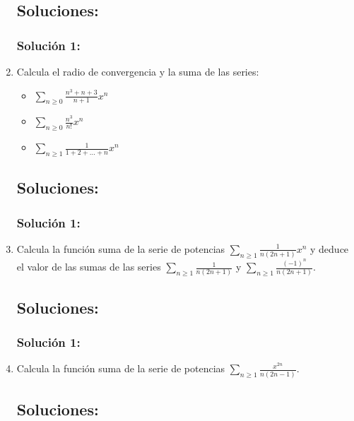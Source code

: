 \documentclass[a4paper, 11pt]{article} %
\begin{document}
\begin{enumerate}
	\subsection*{Soluciones:}
		\subsubsection*{Solución 1:}
	
	\item Calcula el radio de convergencia y la suma de las series:
	\begin{itemize}
		\item $\displaystyle{\sum_{n \geq 0} \frac{n^3+n+3}{n+1}x^n}$
		\item $\displaystyle{\sum_{n \geq 0} \frac{n^3}{n!}x^n}$
		\item $\displaystyle{\sum_{n \geq 1} \frac{1}{1 + 2 + \dots + n}x^n}$
	\end{itemize}
	\subsection*{Soluciones:}
		\subsubsection*{Solución 1:}
	
	\item Calcula la función suma de la serie de potencias $\displaystyle{\sum_{n \geq 1} \frac{1}{n(2n+1)}x^n}$ y
	deduce el valor de las sumas de las series $\displaystyle{\sum_{n \geq 1} \frac{1}{n(2n+1)}}$ y
	$\displaystyle{\sum_{n \geq 1} \frac{(-1)^n}{n(2n+1)}}$.
	\subsection*{Soluciones:}
		\subsubsection*{Solución 1:}
	
	\item Calcula la función suma de la serie de potencias $\displaystyle{\sum_{n \geq 1} \frac{x^{2n}}{n(2n-1)}}$.
	\subsection*{Soluciones:}

\end{enumerate}
\end{document}
